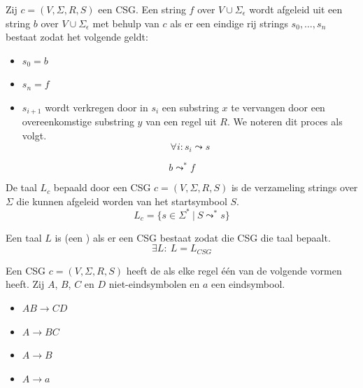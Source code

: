 \documentclass[main.tex]{subfiles}
\begin{document}
\begin{de}
  Zij $c = (V,\Sigma,R,S)$ een CSG.
  Een string $f$ over $V \cup \Sigma_{\epsilon}$ wordt afgeleid uit een string $b$ over $V \cup \Sigma_{\epsilon}$ met behulp van $c$ als er een eindige rij strings $s_{0},\dotsc,s_{n}$ bestaat zodat het volgende geldt:
  \begin{itemize}
  \item $s_{0} = b$
  \item $s_{n} = f$
  \item $s_{i+1}$ wordt verkregen door in $s_{i}$ een substring $x$ te vervangen door een overeenkomstige substring $y$ van een regel uit $R$.
    We noteren dit proces als volgt.
    \[ \forall i: s_{i} \leadsto s \]
  \end{itemize}
  \[ b \leadsto^{*} f \]
\end{de}

\begin{de}
  De taal $L_{c}$ bepaald door een CSG $c = (V,\Sigma,R,S)$ is de verzameling strings over $\Sigma$ die kunnen afgeleid worden van het startsymbool $S$.
  \[ L_{c} = \{ s \in \Sigma^{*}\ |\ S \leadsto^{*} s \}
\]
\end{de}

\begin{de}
  Een taal $L$ is  (een ) als er een CSG bestaat zodat die CSG die taal bepaalt.
  \[ \exists L:\ L = L_{CSG} \]
\end{de}

\begin{de}
  Een CSG $c = (V,\Sigma,R,S)$ heeft de  als elke regel \'e\'en van de volgende vormen heeft.
  Zij $A$, $B$, $C$ en $D$ niet-eindsymbolen en $a$ een eindsymbool.
  \begin{itemize}
  \item $AB \rightarrow CD$
  \item $A \rightarrow BC$
  \item $A \rightarrow B$
  \item $A \rightarrow a$
  \end{itemize}
\end{de}


\end{document}

